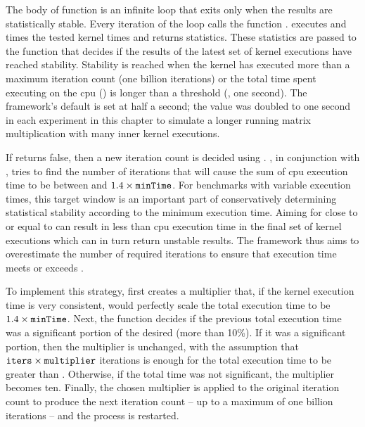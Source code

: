 \documentclass[\main/thesis.tex]{subfiles}
\begin{document}
The body of function  is an infinite loop that exits only when the results are statistically stable.
Every iteration of the loop calls the function .
 executes and times the tested kernel  times and returns statistics.
These statistics are passed to the function  that decides if the results of the latest set of kernel executions have reached stability.
Stability is reached when the kernel has executed more than a maximum iteration count (one billion iterations) or the total time spent executing on the \gls{cpu} () is longer than a threshold (, one second).
The framework's default  is set at half a second; the value was doubled to one second in each experiment in this chapter to simulate a longer running matrix multiplication with many inner kernel executions.

If  returns false, then a new iteration count is decided using .
, in conjunction with , tries to find the number of iterations that will cause the sum of \gls{cpu} execution time to be between  and $1.4 \times \textrm{\code{minTime}}$.
For benchmarks with variable execution times, this target window is an important part of conservatively determining statistical stability according to the minimum execution time.
Aiming for close to or equal to  can result in less than  \gls{cpu} execution time in the final set of kernel executions which can in turn return unstable results.
The framework thus aims to overestimate the number of required iterations to ensure that execution time meets or exceeds .

To implement this strategy,  first creates a multiplier that, if the kernel execution time is very consistent, would perfectly scale the total execution time to be $1.4 \times \textrm{\code{minTime}}$.
Next, the function decides if the previous total execution time was a significant portion of the desired  (more than 10\%).
If it was a significant portion, then the multiplier is unchanged, with the assumption that $\textrm{\code{iters}} \times \textrm{\code{multiplier}}$ iterations is enough for the total execution time to be greater than .
Otherwise, if the total time was not significant, the multiplier becomes ten.
Finally, the chosen multiplier is applied to the original iteration count to produce the next iteration count -- up to a maximum of one billion iterations -- and the process is restarted.
\end{document}
